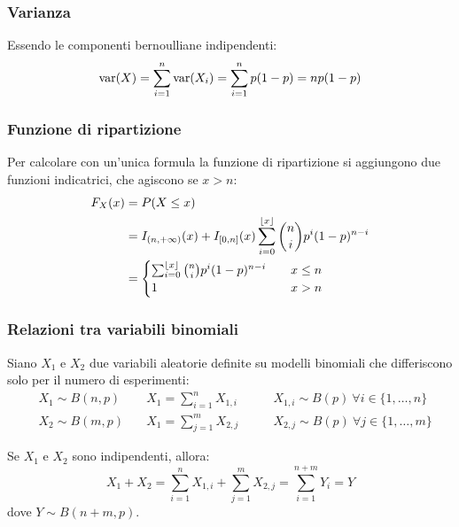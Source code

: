 \subsubsection{Varianza}
Essendo le componenti bernoulliane indipendenti:
\begin{equation}
	\operatorname{var}(X)=\sum_{i=1}^n \operatorname{var}(X_i) = \sum_{i=1}^n p(1-p) = np(1-p)
\end{equation}


\subsubsection{Funzione di ripartizione}
Per calcolare con un'unica formula la funzione di ripartizione si aggiungono due funzioni indicatrici, che agiscono se $x>n$:
\begin{align}
	F_X(x) & = P(X\leq x)                                                                           \nonumber            \\
	       & = I_{(n,+\infty)}(x) + I_{[0,n]}(x) \sum_{i=0}^{\left\lfloor x \right\rfloor}\binom{n}{i} p^i (1-p)^{n-i} \label{eq:ripabinom} \\
	       & = \begin{cases}
		\sum_{i=0}^{\left\lfloor x \right\rfloor}\binom{n}{i} p^i (1-p)^{n-i}\quad & x\leq n \\
		1                                                       & x>n     \\
	\end{cases} \nonumber
\end{align}

\subsubsection{Relazioni tra variabili binomiali}
Siano $X_1$ e $X_2$ due variabili aleatorie definite su modelli binomiali che differiscono solo per il numero di esperimenti:
\begin{align*}
	 & X_1\sim B(n, p)\quad & X_1=\sum_{i=1}^n X_{1,i}\qquad & X_{1,i}\sim B(p)~\forall i\in\{1,\dots,n\} \\
	 & X_2\sim B(m, p)\quad & X_1=\sum_{j=1}^m X_{2,j}\qquad & X_{2,j}\sim B(p)~\forall j\in\{1,\dots,m\}
\end{align*}

\noindent
Se $X_1$ e $X_2$ sono indipendenti, allora:
\begin{equation*}
	X_1+X_2 = \sum_{i=1}^n X_{1,i} + \sum_{j=1}^m X_{2,j} = \sum_{i=1}^{n+m} Y_i = Y
\end{equation*}
dove $Y\sim B(n+m, p)$.



